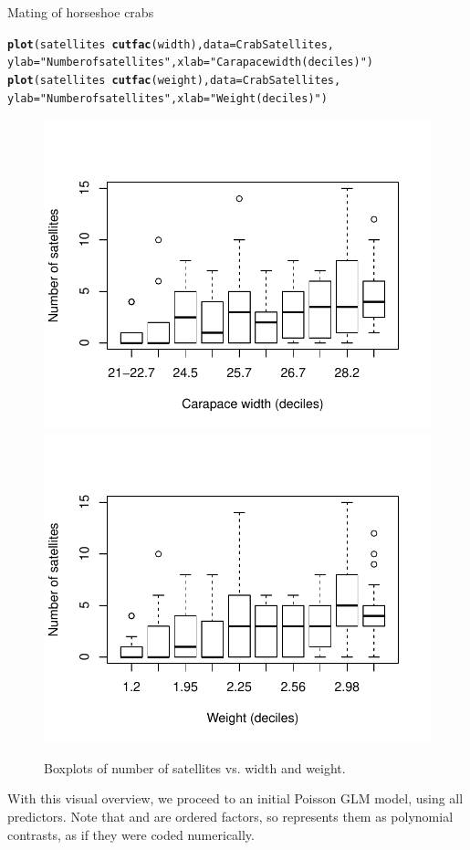 \documentclass[11pt]{book}\usepackage[]{graphicx}\usepackage[]{color}
\makeatletter
\newcommand{\hlstr}[1]{\textcolor[rgb]{0.192,0.494,0.8}{#1}}%
\newcommand{\hlopt}[1]{\textcolor[rgb]{0,0,0}{#1}}%
\newcommand{\hlstd}[1]{\textcolor[rgb]{0.345,0.345,0.345}{#1}}%
\newcommand{\hlkwc}[1]{\textcolor[rgb]{0.333,0.667,0.333}{#1}}%
\newcommand{\hlkwd}[1]{\textcolor[rgb]{0.737,0.353,0.396}{\textbf{#1}}}%
\newenvironment{kframe}{%
 \def\at@end@of@kframe{}%
 \ifinner\ifhmode%
  \def\at@end@of@kframe{\end{minipage}}%
  \begin{minipage}{\columnwidth}%
 \fi\fi%
 \def\FrameCommand##1{\hskip\@totalleftmargin \hskip-\fboxsep
 \colorbox{shadecolor}{##1}\hskip-\fboxsep
     \hskip-\linewidth \hskip-\@totalleftmargin \hskip\columnwidth}%
 \MakeFramed {\advance\hsize-\width
   \@totalleftmargin\z@ \linewidth\hsize
   \@setminipage}}%
 {\par\unskip\endMakeFramed%
 \at@end@of@kframe}
\newenvironment{knitrout}{}{} %
\renewenvironment{knitrout}{\small\renewcommand{\baselinestretch}{.85}}{} %
\makeatother
\begin{document}
\begin{Example}[crabs1]{Mating of horseshoe crabs}
\begin{knitrout}
\color{fgcolor}\begin{kframe}
\begin{alltt}
\hlkwd{plot}\hlstd{(satellites} \hlopt{~} \hlkwd{cutfac}\hlstd{(width),} \hlkwc{data}\hlstd{=CrabSatellites,}
     \hlkwc{ylab}\hlstd{=}\hlstr{"Number of satellites"}\hlstd{,} \hlkwc{xlab}\hlstd{=}\hlstr{"Carapace width (deciles)"}\hlstd{)}
\hlkwd{plot}\hlstd{(satellites} \hlopt{~} \hlkwd{cutfac}\hlstd{(weight),} \hlkwc{data}\hlstd{=CrabSatellites,}
     \hlkwc{ylab}\hlstd{=}\hlstr{"Number of satellites"}\hlstd{,} \hlkwc{xlab}\hlstd{=}\hlstr{"Weight (deciles)"}\hlstd{)}
\end{alltt}
\end{kframe}\begin{figure}[!htbp]


\centerline{\includegraphics[width=.49\textwidth]{ch09/fig/crabs1-boxplots-1} 
\includegraphics[width=.49\textwidth]{ch09/fig/crabs1-boxplots-2} }

\caption[Boxplots of number of satellites vs]{Boxplots of number of satellites vs. width and weight.\label{fig:crabs1-boxplots}}
\end{figure}


\end{knitrout}

With this visual overview, we proceed to an initial Poisson GLM model, using all predictors.
Note that  and  are ordered factors, so  represents them
as polynomial contrasts, as if they were coded numerically.


\end{Example}
\end{document}
